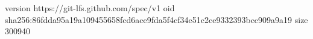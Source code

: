 version https://git-lfs.github.com/spec/v1
oid sha256:86fdda95a19a109455658fcd6ace9fda5f4cf34e51c2ce9332393bcc909a9a19
size 300940
